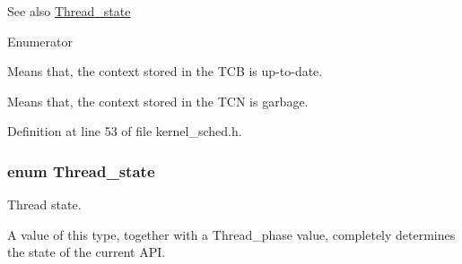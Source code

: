 \begin{DoxySeeAlso}{See also}
\hyperlink{group__scheduler_ga6c969c169777f82c104cf73e501df70f}{Thread\+\_\+state} 
\end{DoxySeeAlso}
\begin{Desc}
\item[Enumerator]\par
\begin{description}
\item[{\em 
C\+T\+X\+\_\+\+C\+L\+E\+AN\hypertarget{group__scheduler_ggab180b4aa356776bddcd724cef4f5deaeaa826daca588e692c88114586b0de472b}{}\label{group__scheduler_ggab180b4aa356776bddcd724cef4f5deaeaa826daca588e692c88114586b0de472b}
}]Means that, the context stored in the T\+CB is up-\/to-\/date. \item[{\em 
C\+T\+X\+\_\+\+D\+I\+R\+TY\hypertarget{group__scheduler_ggab180b4aa356776bddcd724cef4f5deaea2b4b41fda67c1a83e6523675515c007b}{}\label{group__scheduler_ggab180b4aa356776bddcd724cef4f5deaea2b4b41fda67c1a83e6523675515c007b}
}]Means that, the context stored in the T\+CN is garbage. \end{description}
\end{Desc}


Definition at line 53 of file kernel\+\_\+sched.\+h.

\subsubsection[{\texorpdfstring{Thread\+\_\+state}{Thread_state}}]{\setlength{\rightskip}{0pt plus 5cm}enum {\bf Thread\+\_\+state}}\hypertarget{group__scheduler_ga6c969c169777f82c104cf73e501df70f}{}\label{group__scheduler_ga6c969c169777f82c104cf73e501df70f}


Thread state. 

A value of this type, together with a {\ttfamily Thread\+\_\+phase} value, completely determines the state of the current A\+PI.

